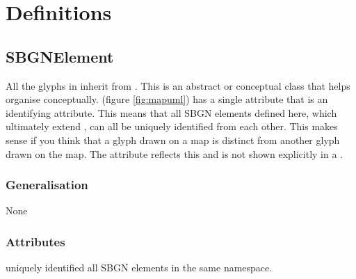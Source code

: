 
\section{Definitions}

\subsection{SBGNElement}

All the glyphs in \SBGNPDLone inherit from
. This is an abstract or conceptual class that
helps organise \PD conceptually.  (figure
\ref{fig:mapuml}) has a single attribute  that is an
identifying attribute. This means that all SBGN elements defined here,
which ultimately extend , can all be uniquely
identified from each other. This makes sense if you think that a glyph
drawn on a map is distinct from another glyph drawn on the map. The
 attribute reflects this and is not shown explicitly in a
\PDm.


\subsubsection{Generalisation}

None

\subsubsection{Attributes}

\begin{attributes}
   uniquely identified all SBGN elements in
  the same namespace.
\end{attributes}

